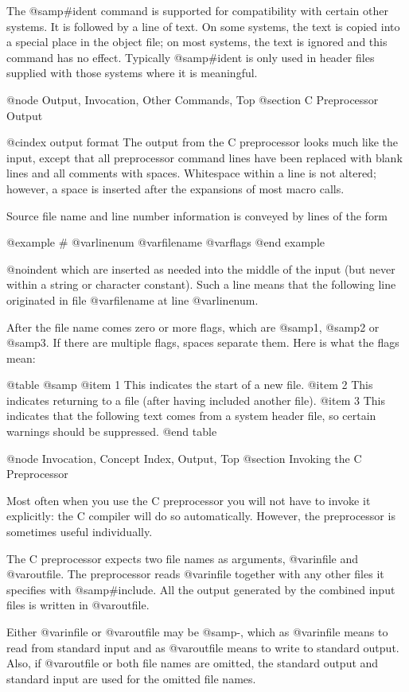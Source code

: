 {{The @samp{#ident} command is supported for compatibility with certain
other systems.  It is followed by a line of text.  On some systems, the
text is copied into a special place in the object file; on most systems,
the text is ignored and this command has no effect.  Typically
@samp{#ident} is only used in header files supplied with those systems
where it is meaningful.

@node Output, Invocation, Other Commands, Top
@section C Preprocessor Output

@cindex output format
The output from the C preprocessor looks much like the input, except
that all preprocessor command lines have been replaced with blank lines
and all comments with spaces.  Whitespace within a line is not altered;
however, a space is inserted after the expansions of most macro calls.

Source file name and line number information is conveyed by lines of
the form

@example
# @var{linenum} @var{filename} @var{flags}
@end example

@noindent
which are inserted as needed into the middle of the input (but never
within a string or character constant).  Such a line means that the
following line originated in file @var{filename} at line @var{linenum}.

After the file name comes zero or more flags, which are @samp{1},
@samp{2} or @samp{3}.  If there are multiple flags, spaces separate
them.  Here is what the flags mean:

@table @samp
@item 1
This indicates the start of a new file.
@item 2
This indicates returning to a file (after having included another file).
@item 3
This indicates that the following text comes from a system header file,
so certain warnings should be suppressed.
@end table

@node Invocation, Concept Index, Output, Top
@section Invoking the C Preprocessor

Most often when you use the C preprocessor you will not have to invoke it
explicitly: the C compiler will do so automatically.  However, the
preprocessor is sometimes useful individually.

The C preprocessor expects two file names as arguments, @var{infile} and
@var{outfile}.  The preprocessor reads @var{infile} together with any other
files it specifies with @samp{#include}.  All the output generated by the
combined input files is written in @var{outfile}.

Either @var{infile} or @var{outfile} may be @samp{-}, which as @var{infile}
means to read from standard input and as @var{outfile} means to write to
standard output.  Also, if @var{outfile} or both file names are omitted,
the standard output and standard input are used for the omitted file names.

}}
